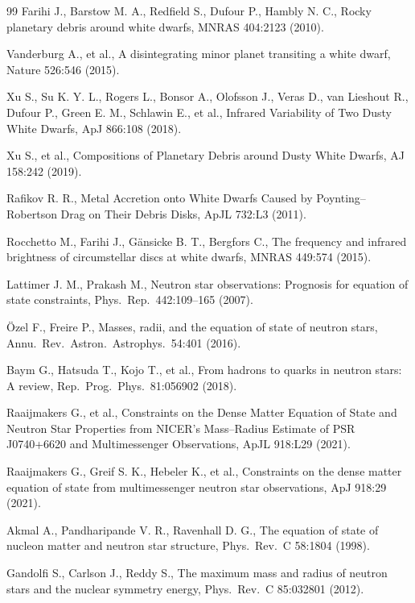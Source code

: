 \begin{thebibliography}{99}
Farihi J., Barstow M. A., Redfield S., Dufour P., Hambly N. C., Rocky planetary debris around white dwarfs, MNRAS 404:2123 (2010).

Vanderburg A., et al., A disintegrating minor planet transiting a white dwarf, Nature 526:546 (2015).

Xu S., Su K. Y. L., Rogers L., Bonsor A., Olofsson J., Veras D., van Lieshout R., Dufour P., Green E. M., Schlawin E., et al., Infrared Variability of Two Dusty White Dwarfs, ApJ 866:108 (2018).

Xu S., et al., Compositions of Planetary Debris around Dusty White Dwarfs, AJ 158:242 (2019).

Rafikov R. R., Metal Accretion onto White Dwarfs Caused by Poynting--Robertson Drag on Their Debris Disks, ApJL 732:L3 (2011).

Rocchetto M., Farihi J., G\"ansicke B. T., Bergfors C., The frequency and infrared brightness of circumstellar discs at white dwarfs, MNRAS 449:574 (2015).

Lattimer J. M., Prakash M., Neutron star observations: Prognosis for equation of state constraints, Phys.\ Rep.\ 442:109--165 (2007).

\"Ozel F., Freire P., Masses, radii, and the equation of state of neutron stars, Annu.\ Rev.\ Astron.\ Astrophys.\ 54:401 (2016).

Baym G., Hatsuda T., Kojo T., et al., From hadrons to quarks in neutron stars: A review, Rep.\ Prog.\ Phys.\ 81:056902 (2018).

Raaijmakers G., et al., Constraints on the Dense Matter Equation of State and Neutron Star Properties from NICER's Mass--Radius Estimate of PSR J0740+6620 and Multimessenger Observations, ApJL 918:L29 (2021).

Raaijmakers G., Greif S. K., Hebeler K., et al., Constraints on the dense matter equation of state from multimessenger neutron star observations, ApJ 918:29 (2021).

Akmal A., Pandharipande V. R., Ravenhall D. G., The equation of state of nucleon matter and neutron star structure, Phys.\ Rev.\ C 58:1804 (1998).

Gandolfi S., Carlson J., Reddy S., The maximum mass and radius of neutron stars and the nuclear symmetry energy, Phys.\ Rev.\ C 85:032801 (2012).


\end{thebibliography}
